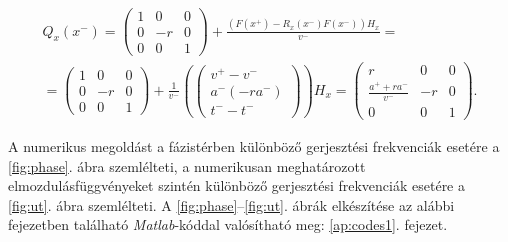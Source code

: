 \begin{equation}
\begin{split}
Q_x(x^-)=\begin{pmatrix}
1 & 0 & 0\\
0 & -r & 0\\
0 & 0 & 1
\end{pmatrix}+\frac{\left(F(x^+)-R_x(x^-)F(x^-)\right)H_x}{v^-}=\\
=\begin{pmatrix}
1 & 0 & 0\\
0 & -r & 0\\
0 & 0 & 1
\end{pmatrix}+\frac{1}{v^-}\left(\begin{pmatrix}
v^+-v^-\\
a^-(-ra^-)\\
t^--t^-
\end{pmatrix} \right)H_x=\begin{pmatrix}
r & 0 & 0\\
\frac{a^++ra^-}{v^-} & -r & 0\\
0 & 0 & 1
\end{pmatrix}.
\end{split}
\end{equation}

A numerikus megoldást a fázistérben különböző gerjesztési frekvenciák esetére a \ref{fig:phase}. ábra szemlélteti, a numerikusan meghatározott elmozdulásfüggvényeket szintén különböző gerjesztési frekvenciák esetére a \ref{fig:ut}. ábra szemlélteti. A \ref{fig:phase}--\ref{fig:ut}. ábrák elkészítése az alábbi fejezetben található \textit{Matlab}-kóddal valósítható meg: \ref{ap:codes1}. fejezet.


